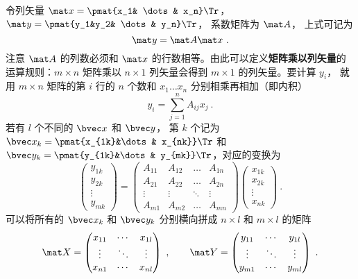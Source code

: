 令列矢量 $\mat x = \pmat{x_1& \dots& x_n}\Tr $，  $\mat y = \pmat{y_1&y_2& \dots& y_n}\Tr$， 系数矩阵为 $\mat A$， 上式可记为
\begin{equation}\label{eq_Mat_5}
\mat y = \mat A\mat x~.
\end{equation} 
注意 $\mat A$ 的列数必须和 $\mat x$ 的行数相等。由此可以定义\textbf{矩阵乘以列矢量}的运算规则：$m \times n$ 矩阵乘以 $n \times 1$ 列矢量会得到 $m \times 1$ 的列矢量。要计算 $y_i$， 就用 $m \times n$ 矩阵的第 $i$ 行的 $n$ 个数和 $x_1 \dots x_n$ 分别相乘再相加（即内积）
\begin{equation}\label{eq_Mat_6}
y_i = \sum_{j = 1}^n A_{ij} x_j ~.
\end{equation}
若有 $l$ 个不同的 $\bvec x$ 和 $\bvec y$， 第 $k$ 个记为 $\bvec x_k = \pmat{x_{1k}&\dots& x_{nk}}\Tr$ 和 $\bvec y_k = \pmat{y_{1k}&\dots& y_{mk}}\Tr$，对应的变换为
\begin{equation}
\begin{pmatrix} y_{1k} \\ y_{2k}\\ \vdots \\ y_{mk} \end{pmatrix}
= \begin{pmatrix}
A_{11}  & A_{12} & \ldots & A_{1n} \\
A_{21}  & A_{22} & \ldots & A_{2n} \\
 \vdots & \vdots  & \ddots & \vdots \\
A_{m1}  & A_{m2} & \ldots & A_{mn}
\end{pmatrix}
\begin{pmatrix} x_{1k} \\ x_{2k} \\ \vdots \\ x_{nk} \end{pmatrix}~.
\end{equation}
可以将所有的 $\bvec x_k$ 和 $\bvec y_k$ 分别横向拼成 $n \times l$ 和 $m \times l$ 的矩阵
\begin{equation}
\mat X =
\begin{pmatrix}
x_{11} & \cdots & x_{1l} \\
 \vdots & \ddots & \vdots \\
x_{n1} & \cdots & x_{nl}
\end{pmatrix}~,
\qquad
\mat Y =
\begin{pmatrix}
y_{11} & \cdots & y_{1l} \\
 \vdots & \ddots & \vdots \\
y_{m1} & \cdots & y_{ml}
\end{pmatrix}~.
\end{equation}
